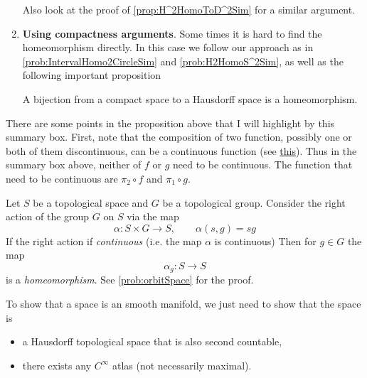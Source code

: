 \begin{summary}
\begin{enumerate}
\begin{itemize}
		\end{itemize}
					
		Also look at the proof of \autoref{prop:H^2HomoToD^2Sim} for a similar argument.
		
		\item \textbf{Using compactness arguments}. Some times it is hard to find the homeomorphism directly. In this case we follow our approach as in \autoref{prob:IntervalHomo2CircleSim} and \autoref{prob:H2HomoS^2Sim}, as well as the following important proposition
		\begin{proposition}
			A bijection from a compact space to a Hausdorff space is a homeomorphism.
		\end{proposition}
	\end{enumerate}
\end{summary}

\begin{summary}
	There are some points in the proposition above that I will highlight by this summary box. First, note that the composition of two function, possibly one or both of them discontinuous, can be a continuous function (see \href{https://math.stackexchange.com/questions/3080559/composition-of-discontinuous-functions#:~:text=A%20simple%20example%20of%20the,functions%20giving%20a%20continuous%20one.&text=g(x)%3Dx(,x)%2B%E2%8C%8Ax%E2%8C%8B.&text=(g%E2%88%98f)(x,discontinuous%20maps%20may%20be%20continuous.}{this}). Thus in the summary box above, neither of $ f $ or $ g $ need to be continuous. The function that need to be continuous are $ \pi_2\circ f $ and $ \pi_1\circ g $.
\end{summary}


\begin{summary}
	Let $ S $ be a topological space and $ G $ be a topological group. Consider the right action of the group $ G $ on $ S $ via the map 
	\[ \alpha : S \times G \to S, \qquad \alpha(s,g) = sg \]
	If the right action if \emph{continuous} (i.e. the map $ \alpha $ is continuous) Then for $ g \in G $ the map
	\[ \alpha_g: S \to S \]
	is a \emph{homeomorphism}. See \autoref{prob:orbitSpace} for the proof.
\end{summary}


\begin{summary}
	\label{summary:ShowingSpaceIsSmoothManifold}
	To show that a space is an smooth manifold, we just need to show that the space is
	\begin{itemize}
		\item a Hausdorff topological space that is also second countable,
		\item there exists any $ C^\infty $ atlas (not necessarily maximal).
	\end{itemize}
\end{summary}


